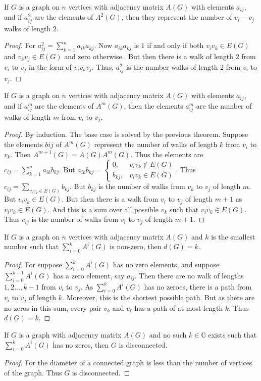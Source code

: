 \documentclass[crop=false,class=book]{standalone}
\begin{document}
\begin{theorem}
If $G$ is a graph on $n$ vertices with adjacency matrix $A(G)$ with elements $a_{ij}$, and if $a^2_{ij}$ are the elements of $A^2(G)$, then they represent the number of $v_{i}-v_{j}$ walks of length $2$.
\end{theorem}
\begin{proof}
For $a^2_{ij} = \sum_{k=1}^{n} a_{ik}a_{kj}$. Now $a_{ik}a_{kj}$ is $1$ if and only if both $v_iv_k \in E(G)$ and $v_kv_j \in E(G)$ and zero otherwise.. But then there is a walk of length $2$ from $v_i$ to $v_j$ in the form of $v_i v_k v_j$. Thus, $a^2_{ij}$ is the number walks of length $2$ from $v_i$ to $v_j$.
\end{proof} 
\begin{theorem}
If $G$ is a graph on $n$ vertices with adjacency matrix $A(G)$ with elements $a_{ij}$, and if $a^m_{ij}$ are the elements of $A^m(G)$, then the elements $a^m_{ij}$ are the number of walks of length $m$ from $v_i$ to $v_j$.
\end{theorem}
\begin{proof}
By induction. The base case is solved by the previous theorem. Suppose the elements $b{ij}$ of $A^m(G)$ represent the number of walks of length $k$ from $v_i$ to $v_k$. Then $A^{m+1}(G)=A(G)A^m(G)$. Thus the elements are $c_{ij} = \sum_{k=1}^{n} a_{ik}b_{kj}$. But $a_{ik}b_{kj} = \begin{cases} 0, & v_i v_k \notin E(G) \\ b_{kj}, & v_i v_k \in E(G)\end{cases}$. Thus $c_{ij} = \underset{v_i v_k \in E(G)}\sum b_{kj}$. But $b_{kj}$ is the number of walks from $v_k$ to $v_j$ of length $m$. But $v_i v_k \in E(G)$. But then there is a walk from $v_i$ to $v_j$ of length $m+1$ as $v_iv_k \in E(G)$. And this is a sum over all possible $v_k$ such that $v_iv_k \in E(G)$. Thus $c_{ij}$ is the number of walks from $v_i$ to $v_j$ of length $m+1$.
\end{proof}
\begin{theorem}
If $G$ is a graph on $n$ vertices with adjacency matrix $A(G)$ and $k$ is the smallest number such that $\sum_{i=0}^{k} A^i(G)$ is non-zero, then $d(G) = k$.
\end{theorem}
\begin{proof}
For suppose $\sum_{i=0}^{k}A^i(G)$ has no zero elements, and suppose $\sum_{i=0}^{k-1}A^i(G)$ has a zero element, say $a_{ij}$. Then there are no walk of lengths $1,2 \hdots, k-1$ from $v_i$ to $v_j$. As $\sum_{i=0}^{k} A^i(G)$ has no zeroes, there is a path from $v_{i}$ to $v_{j}$ of length $k$. Moreover, this is the shortest possible path. But as there are no zeros in this sum, every pair $v_k$ and $v_{\ell}$ has a path of at most length $k$. Thus $d(G)=k$.
\end{proof}
\begin{theorem}
If $G$ is a graph with adjacency matrix $A(G)$ and no such $k\in \mathbb{G}$ exists such that $\sum_{i=0}^{k}A^i(G)$ has no zeros, then $G$ is disconnected.
\end{theorem}
\begin{proof}
For the diameter of a connected graph is less than the number of vertices of the graph. Thus $G$ is disconnected.
\end{proof}
\end{document}
